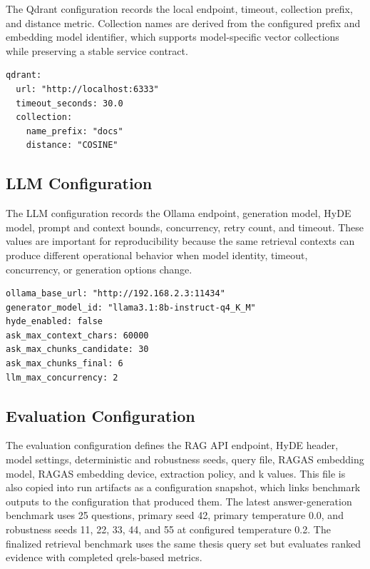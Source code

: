 The Qdrant configuration records the local endpoint, timeout, collection prefix, and distance metric. Collection names are derived from the configured prefix and embedding model identifier, which supports model-specific vector collections while preserving a stable service contract.

\begin{lstlisting}[language={},caption={Representative Qdrant configuration.}]
qdrant:
  url: "http://localhost:6333"
  timeout_seconds: 30.0
  collection:
    name_prefix: "docs"
    distance: "COSINE"
\end{lstlisting}

\subsection{LLM Configuration}

The LLM configuration records the Ollama endpoint, generation model, HyDE model, prompt and context bounds, concurrency, retry count, and timeout. These values are important for reproducibility because the same retrieval contexts can produce different operational behavior when model identity, timeout, concurrency, or generation options change.

\begin{lstlisting}[language={},caption={Representative LLM configuration.}]
ollama_base_url: "http://192.168.2.3:11434"
generator_model_id: "llama3.1:8b-instruct-q4_K_M"
hyde_enabled: false
ask_max_context_chars: 60000
ask_max_chunks_candidate: 30
ask_max_chunks_final: 6
llm_max_concurrency: 2
\end{lstlisting}

\subsection{Evaluation Configuration}

The evaluation configuration defines the RAG API endpoint, HyDE header, model settings, deterministic and robustness seeds, query file, RAGAS embedding model, RAGAS embedding device, extraction policy, and k values. This file is also copied into run artifacts as a configuration snapshot, which links benchmark outputs to the configuration that produced them. The latest answer-generation benchmark uses 25 questions, primary seed 42, primary temperature 0.0, and robustness seeds 11, 22, 33, 44, and 55 at configured temperature 0.2. The finalized retrieval benchmark uses the same thesis query set but evaluates ranked evidence with completed qrels-based metrics.

